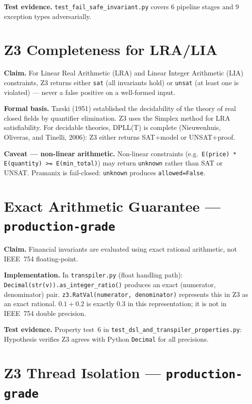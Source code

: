 \documentclass[12pt,a4paper,oneside]{report}
\newcommand{\fname}[1]{\texttt{#1}}          %
\newcommand{\code}[1]{\texttt{#1}}           %
\begin{document}
\textbf{Test evidence.}  \fname{test\_fail\_safe\_invariant.py} covers 6
pipeline stages and 9 exception types adversarially.

\section{Z3 Completeness for LRA/LIA}

\textbf{Claim.}  For Linear Real Arithmetic (LRA) and Linear Integer
Arithmetic (LIA) constraints, Z3 returns either \code{sat} (all invariants
hold) or \code{unsat} (at least one is violated) --- never a false positive
on a well-formed input.

\textbf{Formal basis.}  Tarski (1951) established the decidability of the
theory of real closed fields by quantifier elimination.  Z3 uses the Simplex
method for LRA satisfiability.  For decidable theories, DPLL(T) is complete
(Nieuwenhuis, Oliveras, and Tinelli, 2006): Z3 either returns SAT+model or
UNSAT+proof.

\textbf{Caveat --- non-linear arithmetic.}  Non-linear constraints
(e.g.\ \code{E(price) * E(quantity) >= E(min\_total)}) may return
\code{unknown} rather than SAT or UNSAT.  Pramanix is fail-closed:
\code{unknown} produces \code{allowed=False}.

\section{Exact Arithmetic Guarantee --- \code{production-grade}}

\textbf{Claim.}  Financial invariants are evaluated using exact rational
arithmetic, not IEEE~754 floating-point.

\textbf{Implementation.}  In \fname{transpiler.py} (float handling path):
\code{Decimal(str(v)).as\_integer\_ratio()} produces an exact
(numerator, denominator) pair.  \code{z3.RatVal(numerator, denominator)}
represents this in Z3 as an exact rational.  $0.1 + 0.2$ is exactly
$0.3$ in this representation; it is not in IEEE~754 double precision.

\textbf{Test evidence.}  Property test~6 in
\fname{test\_dsl\_and\_transpiler\_properties.py}: Hypothesis verifies Z3
agrees with Python \code{Decimal} for all precisions.

\section{Z3 Thread Isolation --- \code{production-grade}}
\end{document}
